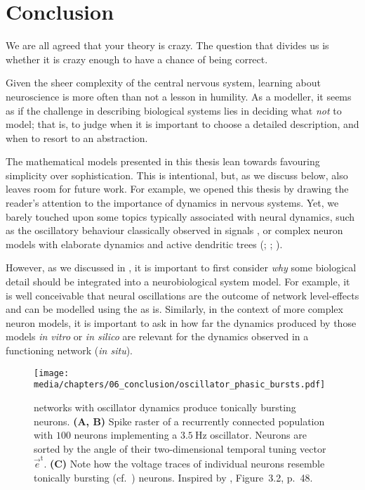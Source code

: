 
\chapter{Conclusion}
\label{chp:conclusion}

\begin{OpeningQuote}
We are all agreed that your theory is crazy. The question that divides us is whether it is crazy enough to have a chance of being correct.
\end{OpeningQuote}

Given the sheer complexity of the central nervous system, learning about neuroscience is more often than not a lesson in humility.
As a modeller, it seems as if the challenge in describing biological systems lies in deciding what \emph{not} to model; that is, to judge when it is important to choose a detailed description, and when to resort to an abstraction.

The mathematical models presented in this thesis lean towards favouring simplicity over sophistication.
This is intentional, but, as we discuss below, also leaves room for future work.
For example, we opened this thesis by drawing the reader's attention to the importance of dynamics in nervous systems.
Yet, we barely touched upon some topics typically associated with neural dynamics, such as the oscillatory behaviour classically observed in \EEG signals \citep[Chapter~8]{lopesdasilva2009electroencephalography,gerstner2002spiking}, or complex neuron models with elaborate dynamics and active dendritic trees (; \cite{izhikevich2007dynamical}; \cite{london2005dendritic}).

However, as we discussed in , it is important to first consider \emph{why} some biological detail should be integrated into a neurobiological system model.
For example, it is well conceivable that neural oscillations are the outcome of network level-effects and can be modelled using the \NEF as is.
Similarly, in the context of more complex neuron models, it is important to ask in how far the dynamics produced by those models \emph{in vitro} or \emph{in silico} are relevant for the dynamics observed in a functioning network (\emph{in situ}).

\begin{figure}
	\centering
	\texttt{[image: media/chapters/06\_conclusion/oscillator\_phasic\_bursts.pdf]}
	\caption[NEF networks with oscillator dynamics produce tonically bursting neurons]{\NEF networks with oscillator dynamics produce tonically bursting neurons.
	\textbf{(A, B)} Spike raster of a recurrently connected \NEF population with $100$ neurons implementing a $\SI{3.5}{\hertz}$ oscillator.
	Neurons are sorted by the angle of their two-dimensional temporal tuning vector $\vec e^\mathrm{t}$.
	\textbf{(C)} Note how the voltage traces of individual neurons resemble tonically bursting (cf.~) neurons.
	Inspired by \citet{voelker2019}, Figure~3.2, p.~48.
	}
	\label{fig:oscillator_phasic_bursts}
\end{figure}

